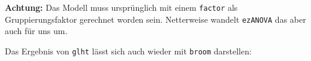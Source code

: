 \documentclass[
]{book}
\newenvironment{Shaded}{\begin{snugshade}}{\end{snugshade}}
\newcommand{\FunctionTok}[1]{\textcolor[rgb]{0.00,0.00,0.00}{#1}}
\newcommand{\NormalTok}[1]{#1}
\newcommand{\SpecialCharTok}[1]{\textcolor[rgb]{0.00,0.00,0.00}{#1}}
\begin{document}
\textbf{Achtung:} Das Modell muss ursprünglich mit einem \texttt{factor} als Gruppierungsfaktor gerechnet worden sein. Netterweise wandelt \texttt{ezANOVA} das aber auch für uns um.

Das Ergebnis von \texttt{glht} lässt sich auch wieder mit \texttt{broom} darstellen:

\begin{Shaded}
\end{Shaded}

 
  \providecommand{\huxb}[2]{\arrayrulecolor[RGB]{#1}\global\arrayrulewidth=#2pt}
  \providecommand{\huxvb}[2]{\color[RGB]{#1}\vrule width #2pt}
  \providecommand{\huxtpad}[1]{\rule{0pt}{#1}}
  \providecommand{\huxbpad}[1]{\rule[-#1]{0pt}{#1}}
\end{document}
